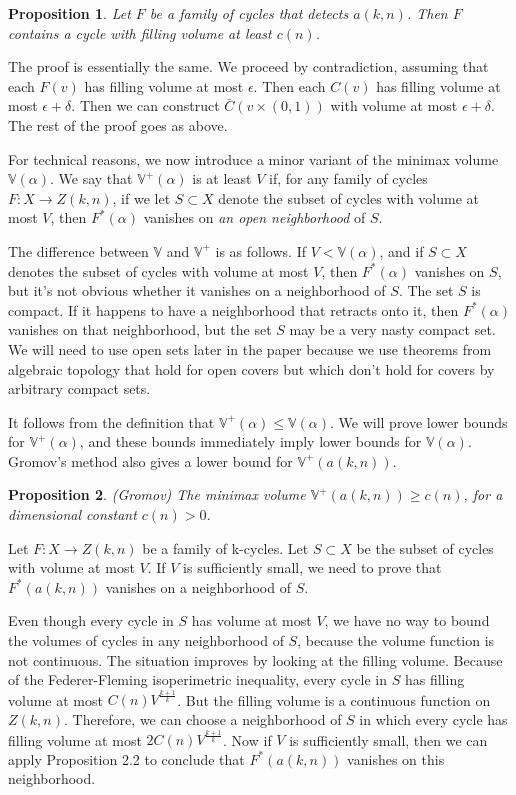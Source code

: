 \documentclass{amsart}
\newtheorem*{Theorem 1}{Theorem 1}
\newtheorem*{Theorem 2}{Theorem 2}
\newtheorem*{Theorem 1A}{Theorem 1A}
\newtheorem*{Theorem 2A}{Theorem 2A}
\newtheorem{prop}{Proposition}[section]
\newtheorem*{vanishing lemma}{Vanishing Lemma}
\numberwithin{equation}{section}
\begin{document}
\begin{prop} Let $F$ be a family of cycles that detects $a(k,n)$. 
Then $F$ contains a cycle with filling volume at least $c(n)$.
\end{prop}

\proof The proof is essentially the same.  We proceed by
contradiction, assuming that each $F(v)$ has filling volume at
most $\epsilon$.  Then each $C(v)$ has filling volume at most
$\epsilon + \delta$.  Then we can construct $\bar C(v \times (0,1))$
with volume at most $\epsilon + \delta$.  The rest of the proof
goes as above. \endproof

For technical reasons, we now introduce a minor variant of the
minimax volume $\mathbb{V}(\alpha)$.  We say that 
$\mathbb{V}^+(\alpha)$ is at least $V$ if, for any
family of cycles $F: X \rightarrow Z(k,n)$, if we let $S \subset
X$ denote the subset of cycles with volume at most $V$, then
$F^*(\alpha)$ vanishes on {\it an open neighborhood} of $S$. 

The difference between $\mathbb{V}$ and $\mathbb{V}^+$ is as
follows.  If $V < \mathbb{V}(\alpha)$, and if $S \subset X$
denotes the subset of cycles with volume at most $V$, then
$F^*(\alpha)$ vanishes on $S$, but it's not obvious whether it
vanishes on a neighborhood of $S$.  The set $S$ is compact.  If
it happens to have a neighborhood that retracts onto it, then
$F^*(\alpha)$ vanishes on that neighborhood, but the set $S$ may
be a very nasty compact set.  We will need to use open sets later
in the paper because we use theorems from algebraic topology that
hold for open covers but which don't hold for covers by arbitrary
compact sets.

It follows from the definition that $\mathbb{V}^+(\alpha) \le
\mathbb{V}(\alpha)$.  We will prove lower bounds for
$\mathbb{V}^+(\alpha)$, and these bounds immediately
imply lower bounds for $\mathbb{V}(\alpha)$.  
Gromov's method also gives a lower bound for $\mathbb{V}^+(a(k,n))$.

\begin{prop} (Gromov) The minimax volume $\mathbb{V}^+(a(k,n)) \ge
c(n)$, for a dimensional constant $c(n) > 0$.
\end{prop}

\proof Let $F: X \rightarrow Z(k,n)$ be a family
of k-cycles.  Let $S \subset X$ be the subset of cycles with
volume at most $V$.  If $V$ is sufficiently small, we need to
prove that $F^*(a(k,n))$ vanishes on a neighborhood of $S$.

Even though every cycle in $S$ has volume at most $V$, we have no
way to bound the volumes of cycles in any neighborhood of $S$,
because the volume function is not continuous.  The situation
improves by looking at the filling volume.  Because of the
Federer-Fleming isoperimetric inequality, every cycle in $S$ has
filling volume at most $C(n) V^{\frac{k+1}{k}}$.  But the filling volume is a
continuous function on $Z(k,n)$.  Therefore, we can choose a
neighborhood of $S$ in which every cycle has filling volume at
most $2 C(n) V^{\frac{k+1}{k}}$.  Now if $V$ is sufficiently small, then we can
apply Proposition 2.2 to conclude that $F^*(a(k,n))$ vanishes on
this neighborhood.  \endproof
\end{document}
